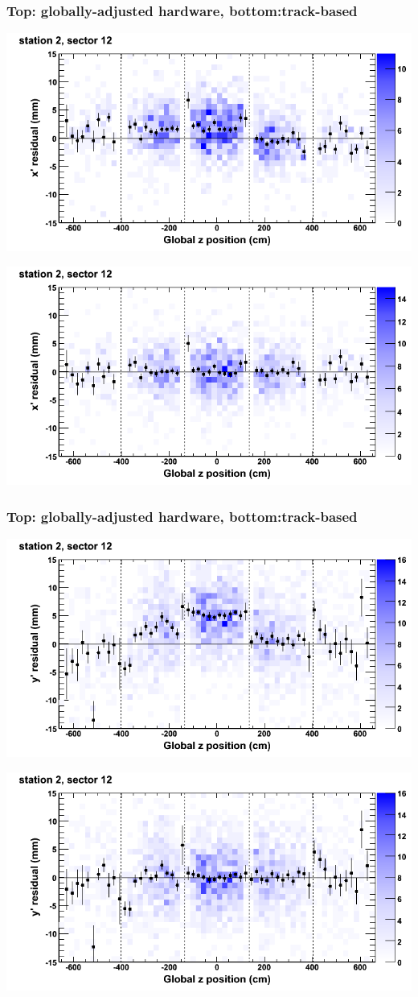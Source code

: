 \documentclass[compress]{beamer}
\begin{document}
\begin{frame}
\frametitle{Top: globally-adjusted hardware, bottom:track-based}
\includegraphics[width=0.7\linewidth]{NOV4_mapplots_HW/DTvsz_st2sec12_x.png}

\includegraphics[width=0.7\linewidth]{NOV4_mapplots/DTvsz_st2sec12_x.png}
\end{frame}

\begin{frame}
\frametitle{Top: globally-adjusted hardware, bottom:track-based}
\includegraphics[width=0.7\linewidth]{NOV4_mapplots_HW/DTvsz_st2sec12_y.png}

\includegraphics[width=0.7\linewidth]{NOV4_mapplots/DTvsz_st2sec12_y.png}
\end{frame}
\end{document}
